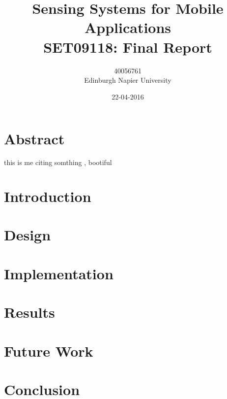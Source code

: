 \documentclass{article}
\title{Sensing Systems for Mobile Applications\\SET09118: Final Report}
\author{40056761\\Edinburgh Napier University}
\date{22-04-2016}
\begin{document}
		
	\maketitle
	
	\section{Abstract}
		\lipsum[1]
		
		this is me citing somthing  \cite{MR2373353}, bootiful \cite{www:www.sharelatex.com}
				
	\newpage
		
		
	\tableofcontents
	
	\newpage
		
	\section{Introduction}
		\lipsum[2-4]
	
	\section{Design}
		\lipsum[3-6]

	\section{Implementation}
		\lipsum[4-7]
	
	\section{Results}
		\lipsum[6-8]
	
	\section{Future Work}
		\lipsum[8-9]
	
	\section{Conclusion}
		\lipsum[9-13]
		
		
		
		
\end{document}

